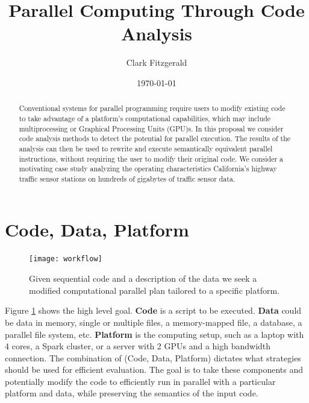 \documentclass[12pt]{article}
\begin{document}
\title{Parallel Computing Through Code Analysis}
\date{\today}
\author{Clark Fitzgerald}
\maketitle

\begin{abstract}


    Conventional systems for parallel programming require users to modify
    existing code to take advantage of a platform's computational
    capabilities, which may include multiprocessing or Graphical Processing
    Units (GPU)s. In this proposal we consider code analysis methods to
    detect the potential for parallel execution. The results of the
    analysis can then be used to rewrite and execute semantically
    equivalent parallel instructions, without requiring the user to modify
    their original code.  We consider a motivating case study analyzing the
    operating characteristics California's highway traffic sensor stations
    on hundreds of gigabytes of traffic sensor data.

\end{abstract}

\section{Code, Data, Platform}

\begin{figure}
\centering
\texttt{[image: workflow]}
\caption{Given sequential code and a description of the data we seek
    a modified computational parallel plan tailored to a specific platform.}
\label{fig:workflow}
\end{figure}

Figure \ref{fig:workflow} shows the high level goal.
\textbf{Code} is a script to be executed.
\textbf{Data} could be data in memory, single or multiple files, a
memory-mapped file, a database, a parallel file system, etc.
\textbf{Platform} is the computing setup, such as a laptop with 4 cores, a
Spark cluster, or a server with 2 GPUs and a high bandwidth connection. The combination
of (Code, Data, Platform) dictates what strategies should be used for
efficient evaluation. The goal is to take these components and potentially
modify the code to efficiently run in parallel with a particular platform
and data, while preserving the semantics of the input code.
\end{document}
